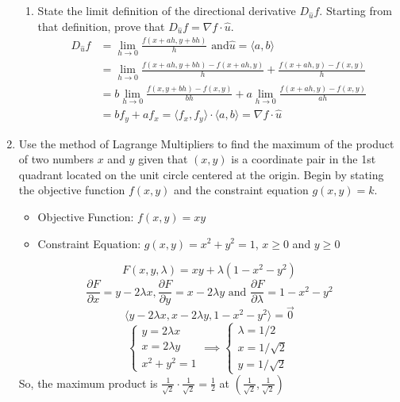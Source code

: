\begin{enumerate}
\begin{enumerate}[label=\alph*.]
		\item State the limit definition of the directional derivative $D_{\hat{u}}f$. Starting from that definition, prove that $D_{\hat{u}}f = \nabla f\cdot\hat{u}$.\\
		\begin{align*}
			D_{\hat{u}}f &= \lim_{h \to 0}{\frac{f(x+ah, y+bh)}{h}} \text{ and} \hat{u}=\langle a, b \rangle \\
			&= \lim_{h \to 0}{\frac{f(x+ah, y+bh) - f(x+ah, y)}{h} + \frac{f(x+ah, y) - f(x,y)}{h}} \\
			&= b\lim_{h \to 0}{\frac{f(x, y+bh) - f(x,y)}{bh}} + a\lim_{h \to 0}{\frac{f(x+ah, y) - f(x,y)}{ah}} \\
			&= bf_y + af_x = \langle f_x, f_y \rangle \cdot \langle a, b \rangle = \nabla f \cdot \hat{u}
		\end{align*}
	\end{enumerate}
	
	\item Use the method of Lagrange Multipliers to find the maximum of the product of two numbers $x$ and $y$ given that $(x,y)$ is a coordinate pair in the 1st quadrant located on the unit circle centered at the origin. Begin by stating the objective function $f(x,y)$ and the constraint equation $g(x,y) = k$.\\
	\begin{itemize}
		\item Objective Function: $f(x,y) = xy$
		\item Constraint Equation: $g(x,y) = x^2 + y^2 = 1$, $x \geq 0$ and $y \geq 0$
	\end{itemize}
	\begin{equation*}
		F(x,y,\lambda) = xy + \lambda(1-x^2-y^2)	
	\end{equation*}
	\begin{equation*}
		\frac{\partial F}{\partial x} = y-2\lambda x, \frac{\partial F}{\partial y} = x-2\lambda y \text{ and } \frac{\partial F}{\partial\lambda} = 1-x^2-y^2
	\end{equation*}
	\begin{equation*}
		\langle y-2\lambda x, x-2 \lambda y, 1-x^2-y^2 \rangle = \vec{0}	
	\end{equation*}
	\begin{equation*}
		\begin{cases}
			y = 2\lambda x \\
			x = 2\lambda y \\
			x^2 + y^2 = 1
		\end{cases} \implies \begin{cases}
			\lambda = 1/2 \\
			x = 1/\sqrt{2} \\
			y = 1/\sqrt{2}
		\end{cases}
	\end{equation*}
	So, the maximum product is $\frac{1}{\sqrt{2}} \cdot \frac{1}{\sqrt{2}} = \frac{1}{2}$ at $\left(\frac{1}{\sqrt{2}}, \frac{1}{\sqrt{2}}\right)$\\
	

\end{enumerate}
